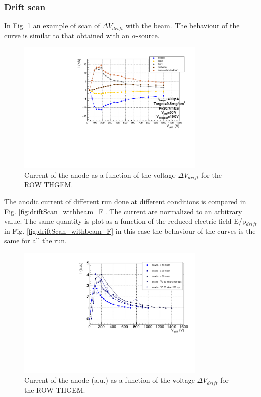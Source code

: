 \documentclass[a4paper, 11 pt]{report}
\newcommand{\Vdrift}{$ \Delta V_{drift}$}
\newcommand{\Edrift}{E/p$_{drift}$}
\begin{document}
  \clearpage
  \subsubsection{Drift scan}
  In Fig. \ref{fig:driftScan_ROW_beam} an example of scan of \Vdrift{} with the beam.
  The behaviour of the curve is similar to that obtained with an $\alpha$-source.
  \begin{figure}[htbp]
	\centering
	\includegraphics[width=0.8\textwidth]
	{Immagini/driftScan_ROW_THGEM_20mbar-Ibeam400pA-2020-03-10_2.pdf}
	\caption{Current of the anode as a function of the voltage \Vdrift{} for the ROW
	THGEM.}
	\label{fig:driftScan_ROW_beam}
  \end{figure}
  The anodic current of different run done at different conditions is compared in Fig. 
  \ref{fig:driftScan_withbeam_F}. The current are normalized to an arbitrary value. 
  The same quantity is plot as a function of the reduced electric field \Edrift{} in Fig.
  \ref{fig:driftScan_withbeam_F} in this case the behaviour of the curves is the same for 
  all the run. 
  \begin{figure}[htbp]
	\centering
	\includegraphics[width=0.8\textwidth]{Immagini/driftScan_ROW_THGEM_comp.pdf}
	\caption{Current of the anode (a.u.) as a function of the voltage \Vdrift{} for the ROW
	THGEM. }
	\label{fig:driftScan_withbeam}
  \end{figure}
\end{document}
